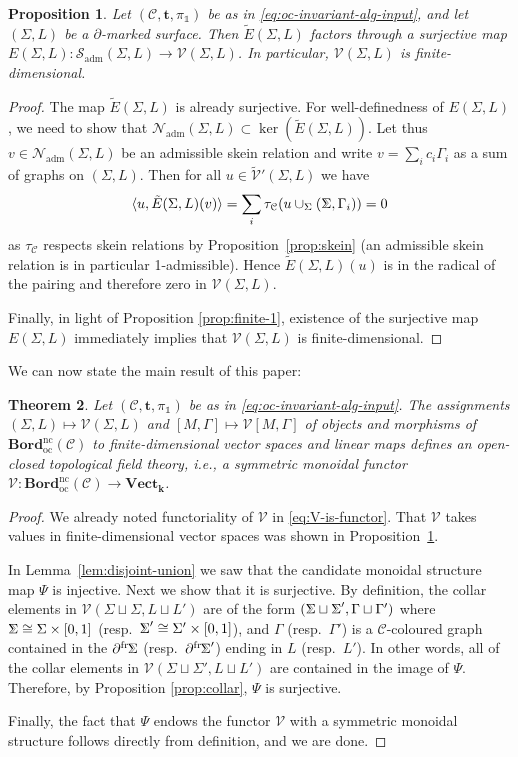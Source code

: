 \documentclass[11pt]{amsart}
\newtheorem{thm}{Theorem}[section]
\newtheorem{prop}[thm]{Proposition}
\theoremstyle{definition}
\numberwithin{equation}{section}
\def\bd{{\partial}}
\def\mtr{{\mathbf{t}}} %
\def\adm{\operatorname{adm}}
\def\ourBord{\mathbf{Bord}^{\operatorname{nc}}_{\operatorname{oc}}}
\newcommand{\bdf}[1]{{\bd^{\operatorname{fr}}\hspace{-1pt}{#1}}}
\newcommand{\pair}[1]{\langle #1 \rangle}
\def\ourV{\cV}
\def\tbv{\widetilde{\ourV}}
\def\sk{\cS}
\newcommand{\bbSigma}{%
  \mathord{
    \tikz[baseline=(char.base)]{
      \node[inner sep=0pt] (char) {$\Sigma$}; %
\begin{scope}[xshift=0.5]
      \draw[line width=0.3pt] (-0.05,0.115)--(0.03,0.002);
      \draw[line width=0.3pt] (-0.06,-0.115)--(0.035,0.004);
\end{scope}
    }
  }
}
\def\cC{\mathcal{C}}
\def\cN{\mathcal{N}}
\def\cS{\mathcal{S}}
\def\cV{\mathcal{V}}
\def\kk{{\bm{k}}}
\def\1{{\mathds{1}}}
\def\to{\rightarrow}
\def\Vect{{\mathbf{Vect}}}
\begin{document}
\begin{prop}\label{prop:our-V}
Let $(\cC, \mtr, \pi_\1)$ be as in \eqref{eq:oc-invariant-alg-input}, and let $(\Sigma, L)$ be a $\bd$-marked surface.
Then $\tilde{E}(\Sigma, L)$ factors through a surjective map $E(\Sigma, L): \sk_{\adm}(\Sigma, L) \to \ourV(\Sigma, L)$. In particular, $\ourV(\Sigma, L)$ is finite-dimensional. 
\end{prop}
\begin{proof}
The map $\tilde{E}(\Sigma, L)$ is already surjective. 
For well-definedness of $E(\Sigma,L)$, we need to show that $\cN_{\adm}(\Sigma, L) \subset \ker(\tilde{E}(\Sigma, L))$.
Let thus $v \in \cN_{\adm}(\Sigma, L)$ be an admissible skein relation and write $v = \sum_i c_i \Gamma_i$ as a sum of graphs on $(\Sigma,L)$. Then for all $u \in \tbv'(\Sigma,L)$ we have
\[
\pair{u,\tilde E(\Sigma,L)(v)}
=
\sum_i \tau_\cC( u \cup_\Sigma (\bbSigma,\Gamma_i) ) 
= 0
\]
as $\tau_\cC$ respects skein relations by Proposition~\ref{prop:skein} (an admissible skein relation is in particular 1-admissible). Hence $\tilde E(\Sigma,L)(u)$ is in the radical of the pairing and therefore zero in $\ourV(\Sigma,L)$.

Finally, in light of Proposition \ref{prop:finite-1}, existence of the surjective map $E(\Sigma,L)$ immediately implies that $\ourV(\Sigma, L)$ is finite-dimensional. 
\end{proof}

We can now state the main result of this paper:

\begin{thm}\label{thm:ocTFT}
Let $(\cC, \mtr, \pi_\1)$ be as in \eqref{eq:oc-invariant-alg-input}. The assignments $(\Sigma, L) \mapsto \ourV(\Sigma, L)$ and $[M, \Gamma] \mapsto \ourV[M, \Gamma]$ of objects and morphisms of $\ourBord(\cC)$ to finite-dimensional vector spaces and linear maps defines an open-closed topological field theory, i.e., a symmetric monoidal functor $\ourV: \ourBord(\cC) \to \Vect_{\kk}$. 
\end{thm}

\begin{proof}
We already noted functoriality of $\ourV$ in \eqref{eq:V-is-functor}. That $\ourV$ takes values in finite-dimensional vector spaces was shown in Proposition~\ref{prop:our-V}. 
    
In Lemma~\ref{lem:disjoint-union} we saw that the candidate monoidal structure map $\Psi$ is injective. Next we show that it is surjective. 
By definition, the collar elements in $\ourV(\Sigma\sqcup\Sigma, L \sqcup L')$ are of the form $(\bbSigma\sqcup\bbSigma', \Gamma\sqcup\Gamma')$ where $\bbSigma \cong \Sigma \times [0, 1]$ (resp.\ $\bbSigma' \cong \Sigma'\times [0, 1]$), and $\Gamma$ (resp.\ $\Gamma'$) is a $\cC$-coloured graph contained in the $\bdf\bbSigma$ (resp.\ $\bdf{\bbSigma'}$) ending in $L$ (resp.\ $L'$). In other words, all of the collar elements in $\ourV(\Sigma\sqcup\Sigma', L\sqcup L')$ are contained in the image of $\Psi$. Therefore, by Proposition \ref{prop:collar}, $\Psi$ is surjective.

Finally, the fact that $\Psi$ endows the functor $\ourV$ with a symmetric monoidal structure follows directly from definition, and we are done.
\end{proof}
\end{document}
